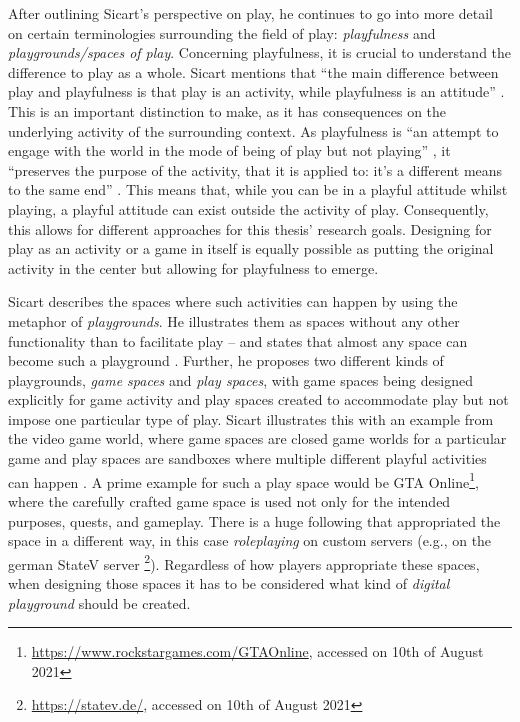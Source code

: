 After outlining Sicart's perspective on play, he continues to go into more detail on certain terminologies surrounding the field of play: \textit{playfulness} and \textit{playgrounds/spaces of play}. Concerning playfulness, it is crucial to understand the difference to play as a whole. Sicart mentions that \enquote{the main difference between play and playfulness is that play is an activity, while playfulness is an attitude} \cite[p. 22]{sicart2014play}. This is an important distinction to make, as it has consequences on the underlying activity of the surrounding context. As playfulness is \enquote{an attempt to engage with the world in the mode of being of play but not playing} \cite[p. 22]{sicart2014play}, it \enquote{preserves the purpose of the activity, that it is applied to: it's a different means to the same end} \cite[p. 26]{sicart2014play}. This means that, while you can be in a playful attitude whilst playing, a playful attitude can exist outside the activity of play. Consequently, this allows for different approaches for this thesis' research goals. Designing for play as an activity or a game in itself is equally possible as putting the original activity in the center but allowing for playfulness to emerge.

Sicart describes the spaces where such activities can happen by using the metaphor of \textit{playgrounds}. He illustrates them as spaces without any other functionality than to facilitate play -- and states that almost any space can become such a playground \cite[p. 7]{sicart2014play}. Further, he proposes two different kinds of playgrounds, \textit{game spaces} and \textit{play spaces}, with game spaces being designed explicitly for game activity and play spaces created to accommodate play but not impose one particular type of play. Sicart illustrates this with an example from the video game world, where game spaces are closed game worlds for a particular game and play spaces are sandboxes where multiple different playful activities can happen \cite[p. 51]{sicart2014play}. A prime example for such a play space would be GTA Online\footnote{\url{https://www.rockstargames.com/GTAOnline}, accessed on 10th of August 2021}, where the carefully crafted game space is used not only for the intended purposes, quests, and gameplay. There is a huge following that appropriated the space in a different way, in this case \textit{roleplaying} on custom servers (e.g., on the german StateV server \footnote{\url{https://statev.de/}, accessed on 10th of August 2021}). Regardless of how players appropriate these spaces, when designing those spaces it has to be considered what kind of \textit{digital playground} should be created.

